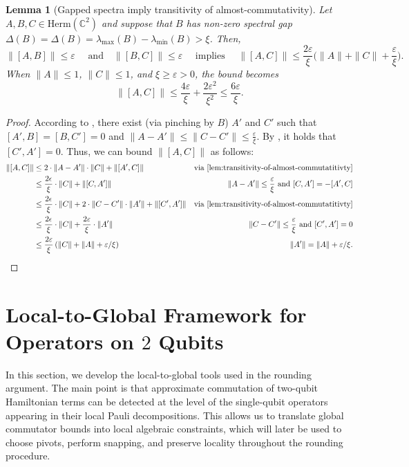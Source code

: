 \documentclass[11pt]{article}
\theoremstyle{plain}
\newtheorem{lemma}[theorem]{Lemma}
\newcommand{\eps}{\varepsilon}
\newcommand{\AnandNote}[1]{\textcolor{red}{(Anand: #1)}}
\newcommand{\AnandNote}[1]{}
\begin{document}
\begin{lemma}[Gapped spectra imply transitivity of almost-commutativity]\label{lem:transitivity-almost}
    Let $A,B,C \in \mathrm{Herm}(\mathbb{C}^{2})$ and suppose that $B$ has non-zero spectral gap $\Delta(B)=\Delta(B)=\lambda_{\max}(B) - \lambda_{\min}(B) > \xi$. Then, 
$$
\|[A,B]\| \leq \eps \quad \text{ and} \quad \|[B,C]\| \leq \eps \quad \text{ implies } \quad \|[A,C]\| \leq \frac{2\eps}{\xi}\Big(\|A\| + \|C\| + \frac{\eps}{\xi} \Big) .
$$
When $\|A\|\leq 1$, $\|C\|\leq 1$, and $\xi \geq  \eps >0$, the bound becomes \[\|[A, C]\| \leq \frac{4\eps}{\xi} + \frac{2\eps^2}{\xi^2} \leq \frac{6\eps}{\xi}.\]
\end{lemma}
\begin{proof}
 According to , there exist (via pinching by $B$) $A'$ and $C'$ such that $[A', B] = [B, C'] = 0$ and $\|A - A'\| \leq \|C - C'\| \leq \frac{\eps}{\xi}$. By , it holds that $[C', A'] = 0$. Thus, we can bound $\|[A, C]\|$ as follows:
    \begin{align*}
        \|[A,C]\| & \leq 2 \cdot \|A - A'\| \cdot \|C\| + \|[A', C]\| & \text{via \Cref{lem:transitivity-of-almost-commutatitivty}}\\
        &\leq \frac{2\epsilon}{\xi} \cdot \|C\| + \|[C, A']\| & \|A - A'\| \leq \frac{\eps}{\xi} \text{ and } [C,A'] = -[A',C]\\
        &\leq \frac{2\epsilon}{\xi} \cdot \|C\| + 2 \cdot \|C - C'\| \cdot \|A'\| + \|[C',A']\| & \text{via \Cref{lem:transitivity-of-almost-commutatitivty}}\\
        & \leq \frac{2\epsilon}{\xi} \cdot \|C\| + \frac{2\eps}{\xi} \cdot \|A'\| & \|C - C'\| \leq \frac{\eps}{\xi} \text{ and } [C', A'] = 0\\
        & \leq \frac{2\eps}{\xi} \left(\|C\| + \|A\| + \eps/\xi \right) & \|A'\| = \|A\| + \eps/\xi.
    \end{align*}
\end{proof}


\section{Local-to-Global Framework for Operators on $2$ Qubits}

In this section, we develop the local-to-global tools used in the rounding
argument.  The main point is that approximate commutation of two-qubit
Hamiltonian terms can be detected at the level of the single-qubit
operators appearing in their local Pauli decompositions.  This allows us to
translate global commutator bounds into local algebraic constraints, which
will later be used to choose pivots, perform snapping, and preserve locality
throughout the rounding procedure.
\end{document}
